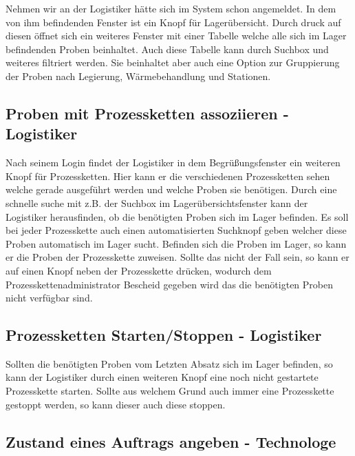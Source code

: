 \documentclass[enabledeprecatedfontcommands,fontsize=12pt,paper=a4,twoside]{scrartcl}
\begin{document}
Nehmen wir an der Logistiker hätte sich im System schon angemeldet.
In dem von ihm befindenden Fenster ist ein Knopf für Lagerübersicht. Durch druck auf diesen öffnet sich ein weiteres Fenster mit einer Tabelle welche alle sich im Lager befindenden Proben beinhaltet. Auch diese Tabelle kann durch Suchbox und weiteres filtriert werden. Sie beinhaltet aber auch eine Option zur Gruppierung der Proben nach Legierung, Wärmebehandlung und Stationen.

\subsection{Proben mit Prozessketten assoziieren - Logistiker}

Nach seinem Login findet der Logistiker in dem Begrüßungsfenster ein weiteren Knopf für Prozessketten. Hier kann er die verschiedenen Prozessketten sehen welche gerade ausgeführt werden und welche Proben sie benötigen. Durch eine schnelle suche mit z.B. der Suchbox im Lagerübersichtsfenster kann der Logistiker herausfinden, ob die benötigten Proben sich im Lager befinden. Es soll bei jeder Prozesskette auch einen automatisierten Suchknopf geben welcher diese Proben automatisch im Lager sucht.
Befinden sich die Proben im Lager, so kann er die Proben der Prozesskette zuweisen. Sollte das nicht der Fall sein, so kann er auf einen Knopf neben der Prozesskette drücken, wodurch dem Prozesskettenadministrator Bescheid gegeben wird das die benötigten Proben nicht verfügbar sind.
 
\subsection{Prozessketten Starten/Stoppen - Logistiker}

Sollten die benötigten Proben vom Letzten Absatz sich im Lager befinden, so kann der Logistiker durch einen weiteren Knopf eine noch nicht gestartete Prozesskette starten.
Sollte aus welchem Grund auch immer eine Prozesskette gestoppt werden, so kann dieser auch diese stoppen.

\subsection{Zustand eines Auftrags angeben - Technologe}
\end{document}
